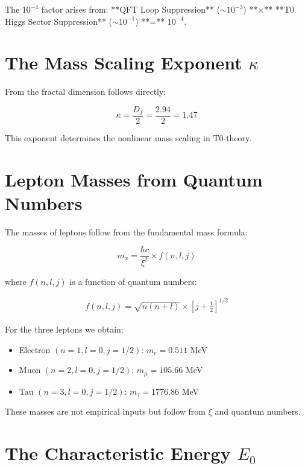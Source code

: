 \documentclass[12pt,a4paper]{article}
\begin{document}
The $10^{-4}$ factor arises from: **QFT Loop Suppression** ($\sim 10^{-3}$) **×** **T0 Higgs Sector Suppression** ($\sim 10^{-1}$) **=** $10^{-4}$.

	\section{The Mass Scaling Exponent $\kappa$}
	
	From the fractal dimension follows directly:
	
	\begin{equation}
		\kappa = \frac{D_f}{2} = \frac{2.94}{2} = 1.47
	\end{equation}
	
	This exponent determines the nonlinear mass scaling in T0-theory.
	
	\section{Lepton Masses from Quantum Numbers}
	
	The masses of leptons follow from the fundamental mass formula:
	
	\begin{equation}
		m_x = \frac{\hbar c}{\xi^2} \times f(n, l, j)
	\end{equation}
	
	where $f(n, l, j)$ is a function of quantum numbers:
	
	\begin{align}
		f(n, l, j) = \sqrt{n(n+l)} \times \left[j + \frac{1}{2}\right]^{1/2}
	\end{align}
	
	For the three leptons we obtain:
	
	\begin{itemize}
		\item Electron $(n=1, l=0, j=1/2)$: $m_e = 0.511$ MeV
		\item Muon $(n=2, l=0, j=1/2)$: $m_\mu = 105.66$ MeV
		\item Tau $(n=3, l=0, j=1/2)$: $m_\tau = 1776.86$ MeV
	\end{itemize}
	
	These masses are not empirical inputs but follow from $\xi$ and quantum numbers.
	
	\section{The Characteristic Energy $E_0$}
	
\end{document}
